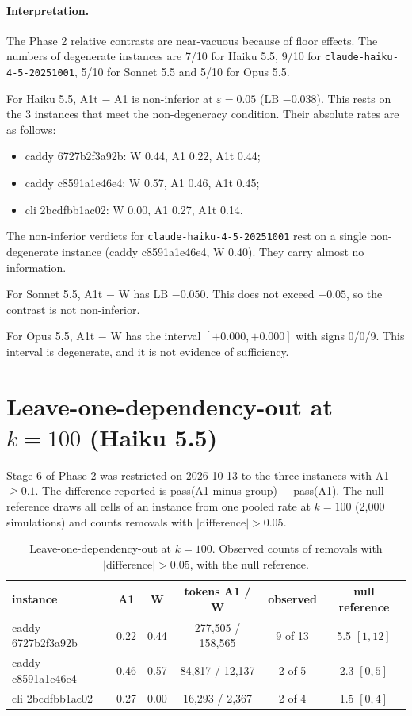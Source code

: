 \documentclass[11pt,a4paper]{article}
\newcommand{\eps}{\varepsilon}
\begin{document}
\paragraph{Interpretation.}
The Phase 2 relative contrasts are near-vacuous because of floor effects. The numbers of degenerate instances are 7/10 for Haiku 5.5, 9/10 for \texttt{claude-haiku-4-5-20251001}, 5/10 for Sonnet 5.5 and 5/10 for Opus 5.5.

For Haiku 5.5, A1t $-$ A1 is non-inferior at $\eps = 0.05$ (LB $-0.038$). This rests on the 3 instances that meet the non-degeneracy condition. Their absolute rates are as follows:
\begin{itemize}
\item caddy 6727b2f3a92b: W 0.44, A1 0.22, A1t 0.44;
\item caddy c8591a1e46e4: W 0.57, A1 0.46, A1t 0.45;
\item cli 2bcdfbb1ac02: W 0.00, A1 0.27, A1t 0.14.
\end{itemize}

The non-inferior verdicts for \texttt{claude-haiku-4-5-20251001} rest on a single non-degenerate instance (caddy c8591a1e46e4, W 0.40). They carry almost no information.

For Sonnet 5.5, A1t $-$ W has LB $-0.050$. This does not exceed $-0.05$, so the contrast is not non-inferior.

For Opus 5.5, A1t $-$ W has the interval $[+0.000, +0.000]$ with signs 0/0/9. This interval is degenerate, and it is not evidence of sufficiency.

\section{Leave-one-dependency-out at $k=100$ (Haiku 5.5)}

Stage 6 of Phase 2 was restricted on 2026-10-13 to the three instances with A1 $\geq 0.1$. The difference reported is pass(A1 minus group) $-$ pass(A1). The null reference draws all cells of an instance from one pooled rate at $k=100$ (2,000 simulations) and counts removals with $|\text{difference}| > 0.05$.

\begin{table}[h]
\centering
\caption{Leave-one-dependency-out at $k=100$. Observed counts of removals with $|\text{difference}| > 0.05$, with the null reference.}
\label{tab:loo}
\small
\begin{tabular}{lccccc}
\toprule
instance & A1 & W & tokens A1 / W & observed & null reference\\
\midrule
caddy 6727b2f3a92b & 0.22 & 0.44 & 277,505 / 158,565 & 9 of 13 & 5.5 $[1, 12]$\\
caddy c8591a1e46e4 & 0.46 & 0.57 & 84,817 / 12,137 & 2 of 5 & 2.3 $[0, 5]$\\
cli 2bcdfbb1ac02 & 0.27 & 0.00 & 16,293 / 2,367 & 2 of 4 & 1.5 $[0, 4]$\\
\bottomrule
\end{tabular}
\end{table}
\end{document}
